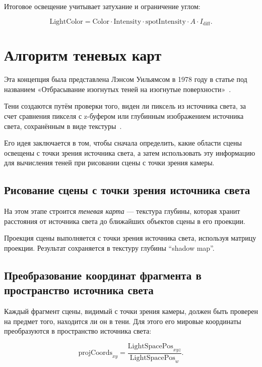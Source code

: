 Итоговое освещение учитывает затухание и ограничение углом:

\begin{equation}
    \label{equ:spot_lambert}
    \text{LightColor} = \text{Color} \cdot \text{Intensity} \cdot \text{spotIntensity} \cdot A \cdot I_{\text{diff}}.
\end{equation}

\section{Алгоритм теневых карт}

Эта концепция была представлена Лэнсом Уильямсом в 1978 году
в статье под названием
«Отбрасывание изогнутых теней на изогнутые поверхности»~\cite{history}.

Тени создаются путём проверки того, виден ли пиксель из источника света,
за счет сравнения пикселя с z-буфером или глубинным изображением источника света,
сохранённым в виде текстуры~\cite{OpenGL_DevidVolf}.

Его идея заключается в том, чтобы сначала определить,
какие области сцены освещены с точки зрения источника света,
а затем использовать эту информацию для вычисления теней
при рисовании сцены с точки зрения камеры.

\subsection*{Рисование сцены с точки зрения источника света}

На этом этапе строится \textit{теневая карта} — текстура глубины,
которая хранит расстояния от источника света до ближайших объектов сцены в его проекции.

Проекция сцены выполняется с точки зрения источника света, используя матрицу проекции.
Результат сохраняется в текстуру глубины \enquote{shadow map}.

\subsection*{Преобразование координат фрагмента в пространство источника света}

Каждый фрагмент сцены, видимый с точки зрения камеры,
должен быть проверен на предмет того, находится ли он в тени.
Для этого его мировые координаты преобразуются в пространство источника света:

\begin{equation}
    \label{equ:projected_coords}
    \text{projCoords}_{xy} = \frac{\text{LightSpacePos}_{xyz}}{\text{LightSpacePos}_w}.
\end{equation}

